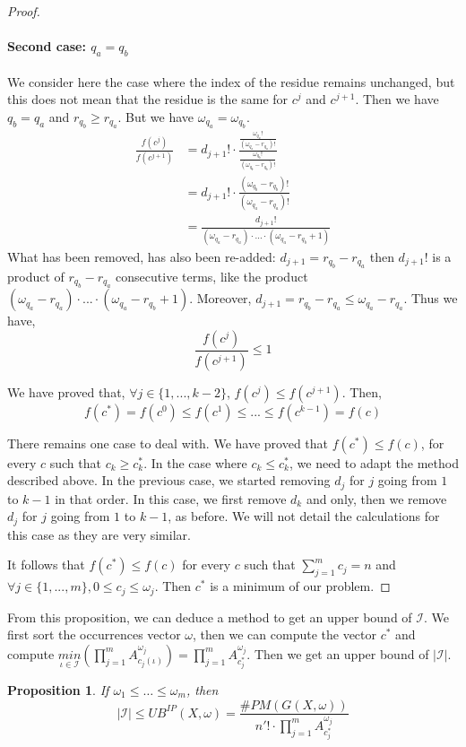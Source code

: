\documentclass[jair,twoside,11pt,theapa]{article}
\newtheorem{proposition}[theorem]{Proposition}
\newcommand{\nbperfectmatching}[1]{\#PM(#1)}
\begin{document}
\begin{proof}
\paragraph{Second case: $q_a=q_b$}
We consider here the case where the index of the residue remains unchanged, but this does not mean that the residue is the same for $c^j$ and $c^{j+1}$. Then we have $q_b = q_a$ and $r_{q_b} \geq r_{q_a}$. But we have $\omega_{q_a} = \omega_{q_b}$.
\begin{align*}
	\frac{f(c^j)}{f(c^{j+1})} &= d_{j+1}! \cdot \frac{\frac{\omega_{q_a}!}{(\omega_{q_a}-r_{q_a})!}}  {\frac{\omega_{q_b}!}{(\omega_{q_b}-r_{q_b})!}} \\
											&= d_{j+1}! \cdot \frac{(\omega_{q_b} - r_{q_b})!}{(\omega_{q_a} - r_{q_a})!} \\
											&= \frac{d_{j+1}!}{(\omega_{q_a}-r_{q_a}) \cdot... \cdot (\omega_{q_a} - r_{q_b} +1)}
\end{align*}
What has been removed, has also been re-added: $d_{j+1}=r_{q_b}-r_{q_a}$ then $d_{j+1}!$ is a product of $r_{q_b}-r_{q_a}$ consecutive terms, like the product $(\omega_{q_a}-r_{q_a}) \cdot... \cdot (\omega_{q_a} - r_{q_b} +1)$. Moreover, $d_{j+1}=r_{q_b}-r_{q_a} \leq \omega_{q_a} - r_{q_a}$. Thus we have,
\begin{equation*}
	\frac{f(c^j)}{f(c^{j+1})} \leq 1
\end{equation*}

We have proved that, $\forall j \in \lbrace 1,..., k-2 \rbrace$, $f(c^j) \leq f(c^{j+1})$. Then,
\begin{equation*}
	f(c^*)=f(c^0) \leq f(c^1) \leq ... \leq f(c^{k-1}) = f(c)
\end{equation*}

There remains one case to deal with. We have proved that $f(c^*) \leq f(c)$, for every $c$ such that $c_k \geq c^*_k $. In the case where $c_k \leq c^*_k$, we need to adapt the method described above. In the previous case, we started removing $d_j$ for $j$ going from $1$ to $k-1$ in that order. In this case, we first remove $d_k$ and only, then we remove $d_j$ for $j$ going from $1$ to $k-1$, as before.
We will not detail the calculations for this case as they are very similar. 

It follows that $f(c^*) \leq f(c)$ for every $c$ such that $\sum_{j=1}^m c_j=n$ and $\forall j \in \lbrace 1,...,m \rbrace, 0 \leq c_j \leq \omega_j$. Then $c^*$ is a minimum of our problem.
\end{proof}

From this proposition, we can deduce a method to get an upper bound of $\mathcal{I}$. We first sort the occurrences vector $\omega$, then we can compute the vector $c^*$ and compute $\underset{\iota \in \mathcal{I}}{min}(\prod_{j=1}^m A_{c_j(\iota)}^{\omega_j})=\prod_{j=1}^m A_{c^*_j}^{\omega_j}$. Then we get an upper bound of $|\mathcal{I}|$.
\begin{proposition}
	If $\omega_1 \leq \ldots \leq \omega_m$, then
	\begin{equation}
		|\mathcal{I}| \leq UB^{IP}(X, \omega) = \frac{\nbperfectmatching{G(X,\omega)}}{n'! \cdot \prod_{j=1}^m A_{c^*_j}^{\omega_j}}
	\end{equation}
\end{proposition}
\end{document}
